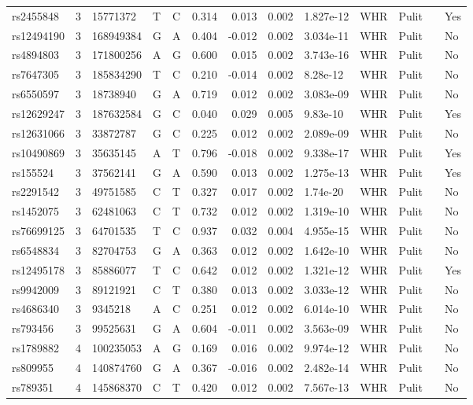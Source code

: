 \documentclass[11pt,twoside]{bristolthesis}
\begin{document}
\begin{longtable}[t]{lrlllrrrlllll}
rs2455848 & 3 & 15771372 & T & C & 0.314 & 0.013 & 0.002 & 1.827e-12 & WHR & Pulit &  & Yes\\
\addlinespace
rs12494190 & 3 & 168949384 & G & A & 0.404 & -0.012 & 0.002 & 3.034e-11 & WHR & Pulit &  & No\\
rs4894803 & 3 & 171800256 & A & G & 0.600 & 0.015 & 0.002 & 3.743e-16 & WHR & Pulit &  & No\\
rs7647305 & 3 & 185834290 & T & C & 0.210 & -0.014 & 0.002 & 8.28e-12 & WHR & Pulit &  & No\\
rs6550597 & 3 & 18738940 & G & A & 0.719 & 0.012 & 0.002 & 3.083e-09 & WHR & Pulit &  & No\\
rs12629247 & 3 & 187632584 & G & C & 0.040 & 0.029 & 0.005 & 9.83e-10 & WHR & Pulit &  & Yes\\
\addlinespace
rs12631066 & 3 & 33872787 & G & C & 0.225 & 0.012 & 0.002 & 2.089e-09 & WHR & Pulit &  & No\\
rs10490869 & 3 & 35635145 & A & T & 0.796 & -0.018 & 0.002 & 9.338e-17 & WHR & Pulit &  & Yes\\
rs155524 & 3 & 37562141 & G & A & 0.590 & 0.013 & 0.002 & 1.275e-13 & WHR & Pulit &  & Yes\\
rs2291542 & 3 & 49751585 & C & T & 0.327 & 0.017 & 0.002 & 1.74e-20 & WHR & Pulit &  & No\\
rs1452075 & 3 & 62481063 & C & T & 0.732 & 0.012 & 0.002 & 1.319e-10 & WHR & Pulit &  & No\\
\addlinespace
rs76699125 & 3 & 64701535 & T & C & 0.937 & 0.032 & 0.004 & 4.955e-15 & WHR & Pulit &  & No\\
rs6548834 & 3 & 82704753 & G & A & 0.363 & 0.012 & 0.002 & 1.642e-10 & WHR & Pulit &  & No\\
rs12495178 & 3 & 85886077 & T & C & 0.642 & 0.012 & 0.002 & 1.321e-12 & WHR & Pulit &  & Yes\\
rs9942009 & 3 & 89121921 & C & T & 0.380 & 0.013 & 0.002 & 3.033e-12 & WHR & Pulit &  & No\\
rs4686340 & 3 & 9345218 & A & C & 0.251 & 0.012 & 0.002 & 6.014e-10 & WHR & Pulit &  & No\\
\addlinespace
rs793456 & 3 & 99525631 & G & A & 0.604 & -0.011 & 0.002 & 3.563e-09 & WHR & Pulit &  & No\\
rs1789882 & 4 & 100235053 & A & G & 0.169 & 0.016 & 0.002 & 9.974e-12 & WHR & Pulit &  & No\\
rs809955 & 4 & 140874760 & G & A & 0.367 & -0.016 & 0.002 & 2.482e-14 & WHR & Pulit &  & No\\
rs789351 & 4 & 145868370 & C & T & 0.420 & 0.012 & 0.002 & 7.567e-13 & WHR & Pulit &  & No\\

\end{longtable}
\end{document}
